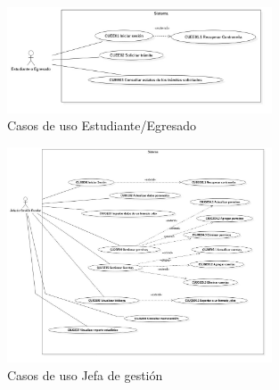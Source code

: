 \begin{figure}[htbp!]
    \centering
        \includegraphics[width=0.7\textwidth]{images/img_casos/Estudiante.jpg}
    \caption{Casos de uso Estudiante/Egresado}
\end{figure}


\begin{figure}[htbp!]
    \centering
        \includegraphics[width=0.7\textwidth]{images/img_casos/JefadeGestion.jpg}
    \caption{Casos de uso Jefa de gestión}
\end{figure}


